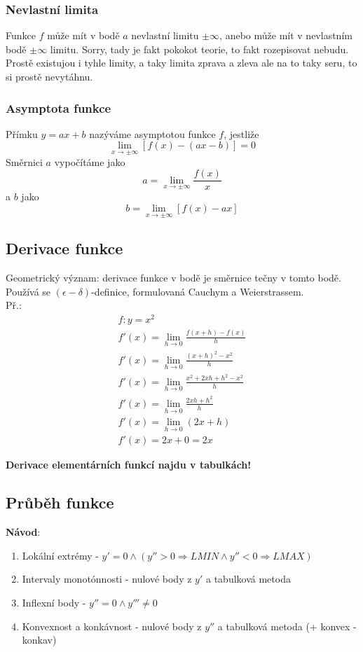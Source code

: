 \documentclass[12pt, a4paper]{article}
\newcommand{\imply}{\Rightarrow}
\begin{document}
\subsubsection*{Nevlastní limita}
Funkce $f$ může mít v bodě $a$ nevlastní limitu $\pm \infty$, anebo může mít v nevlastním bodě $\pm \infty$ limitu. Sorry, tady je fakt pokokot teorie, to fakt rozepisovat nebudu. Prostě existujou i tyhle limity, a taky limita zprava a zleva ale na to taky seru, to si prostě nevytáhnu.

\subsubsection*{Asymptota funkce}
Přímku $y=ax+b$ nazýváme asymptotou funkce $f$, jestliže \[ \lim_{x \to \pm \infty} [f(x)-(ax-b)] = 0 \]
Směrnici $a$ vypočítáme jako \[ a = \lim_{x \to \pm \infty} \frac{f(x)}{x} \] a $b$ jako \[ b = \lim_{x \to \pm \infty} [f(x)-ax] \]

\subsection*{Derivace funkce}
Geometrický význam: derivace funkce v bodě je směrnice tečny v tomto bodě.\\
Používá se $(\epsilon - \delta)$-definice, formulovaná Cauchym a Weierstrassem.\\
Př.:\\
\begin{align*}
	f: y = x^2\\
	f'(x) = \lim_{h \to 0} \frac{f(x+h)-f(x)}{h}\\
	f'(x) = \lim_{h \to 0} \frac{(x+h)^2-x^2}{h} \\
	 f'(x) = \lim_{h \to 0} \frac{x^2 + 2xh + h^2 - x^2}{h} \\
	 f'(x) = \lim_{h \to 0} \frac{2xh+h^2}{h} \\
	 f'(x) = \lim_{h \to 0} (2x+h)  \\
	 f'(x) = 2x + 0 = 2x 
\end{align*}

\textbf{Derivace elementárních funkcí najdu v tabulkách!}
\newpage
\subsection*{Průběh funkce}
\textbf{Návod}:
\begin{enumerate}
	\item Lokální extrémy - $y'=0 \land (y'' > 0 \imply LMIN \land y'' < 0 \imply LMAX)$
	\item Intervaly monotónnosti - nulové body z $y'$ a tabulková metoda
	\item Inflexní body - $y'' = 0 \land y''' \neq 0$
	\item Konvexnost a konkávnost - nulové body z $y''$ a tabulková metoda (+ konvex - konkav)
\end{enumerate}
\end{document}
